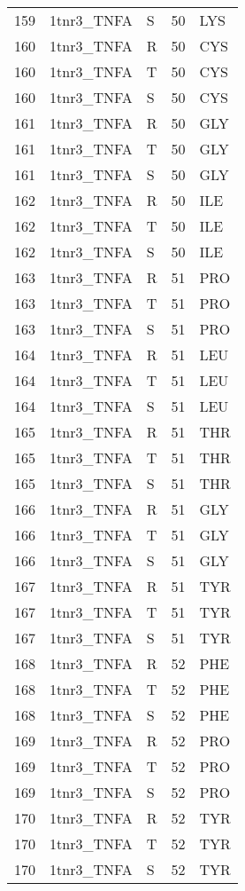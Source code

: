 \begin{tiny}
\begin{longtable}[l]{l|l|l|l|l}
	159 & 1tnr3\_TNFA & S & 50 & LYS \\
	160 & 1tnr3\_TNFA & R & 50 & CYS \\
	160 & 1tnr3\_TNFA & T & 50 & CYS \\
	160 & 1tnr3\_TNFA & S & 50 & CYS \\
	161 & 1tnr3\_TNFA & R & 50 & GLY \\
	161 & 1tnr3\_TNFA & T & 50 & GLY \\
	161 & 1tnr3\_TNFA & S & 50 & GLY \\
	162 & 1tnr3\_TNFA & R & 50 & ILE \\
	162 & 1tnr3\_TNFA & T & 50 & ILE \\
	162 & 1tnr3\_TNFA & S & 50 & ILE \\
	163 & 1tnr3\_TNFA & R & 51 & PRO \\
	163 & 1tnr3\_TNFA & T & 51 & PRO \\
	163 & 1tnr3\_TNFA & S & 51 & PRO \\
	164 & 1tnr3\_TNFA & R & 51 & LEU \\
	164 & 1tnr3\_TNFA & T & 51 & LEU \\
	164 & 1tnr3\_TNFA & S & 51 & LEU \\
	165 & 1tnr3\_TNFA & R & 51 & THR \\
	165 & 1tnr3\_TNFA & T & 51 & THR \\
	165 & 1tnr3\_TNFA & S & 51 & THR \\
	166 & 1tnr3\_TNFA & R & 51 & GLY \\
	166 & 1tnr3\_TNFA & T & 51 & GLY \\
	166 & 1tnr3\_TNFA & S & 51 & GLY \\
	167 & 1tnr3\_TNFA & R & 51 & TYR \\
	167 & 1tnr3\_TNFA & T & 51 & TYR \\
	167 & 1tnr3\_TNFA & S & 51 & TYR \\
	168 & 1tnr3\_TNFA & R & 52 & PHE \\
	168 & 1tnr3\_TNFA & T & 52 & PHE \\
	168 & 1tnr3\_TNFA & S & 52 & PHE \\
	169 & 1tnr3\_TNFA & R & 52 & PRO \\
	169 & 1tnr3\_TNFA & T & 52 & PRO \\
	169 & 1tnr3\_TNFA & S & 52 & PRO \\
	170 & 1tnr3\_TNFA & R & 52 & TYR \\
	170 & 1tnr3\_TNFA & T & 52 & TYR \\
	170 & 1tnr3\_TNFA & S & 52 & TYR \\

\end{longtable}
\end{tiny}
